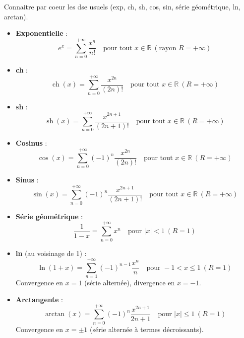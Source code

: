 \documentclass[french, 11pt]{article}
\begin{document}
\begin{exercice}{}{}
    Connaitre par coeur les dse usuels (exp, ch, sh, cos, sin, série géométrique, ln, arctan).
    \tcblower
    \begin{itemize}
        \item \textbf{Exponentielle} : 
        \[
        e^{x} = \sum_{n=0}^{+\infty} \frac{x^{n}}{n!} \quad \text{pour tout } x \in \mathbb{R} \ (\text{rayon } R = +\infty)
        \]

        \item \textbf{ch} : 
        \[
        \operatorname{ch}(x) = \sum_{n=0}^{+\infty} \frac{x^{2n}}{(2n)!} \quad \text{pour tout } x \in \mathbb{R} \ (R = +\infty)
        \]

        \item \textbf{sh} : 
        \[
        \operatorname{sh}(x) = \sum_{n=0}^{+\infty} \frac{x^{2n+1}}{(2n+1)!} \quad \text{pour tout } x \in \mathbb{R} \ (R = +\infty)
        \]

        \item \textbf{Cosinus} : 
        \[
        \cos(x) = \sum_{n=0}^{+\infty} (-1)^{n} \frac{x^{2n}}{(2n)!} \quad \text{pour tout } x \in \mathbb{R} \ (R = +\infty)
        \]

        \item \textbf{Sinus} : 
        \[
        \sin(x) = \sum_{n=0}^{+\infty} (-1)^{n} \frac{x^{2n+1}}{(2n+1)!} \quad \text{pour tout } x \in \mathbb{R} \ (R = +\infty)
        \]

        \item \textbf{Série géométrique} : 
        \[
        \frac{1}{1 - x} = \sum_{n=0}^{+\infty} x^{n} \quad \text{pour } |x| < 1 \ (R = 1)
        \]

        \item \textbf{ln} (au voisinage de 1) : 
        \[
        \ln(1 + x) = \sum_{n=1}^{+\infty} (-1)^{n-1} \frac{x^{n}}{n} \quad \text{pour } -1 < x \le 1 \ (R = 1)
        \]
        Convergence en \(x = 1\) (série alternée), divergence en \(x = -1\).

        \item \textbf{Arctangente} : 
        \[
        \arctan(x) = \sum_{n=0}^{+\infty} (-1)^{n} \frac{x^{2n+1}}{2n+1} \quad \text{pour } |x| \le 1 \ (R = 1)
        \]
        Convergence en \(x = \pm 1\) (série alternée à termes décroissants).
    \end{itemize}
\end{exercice}
\end{document}
